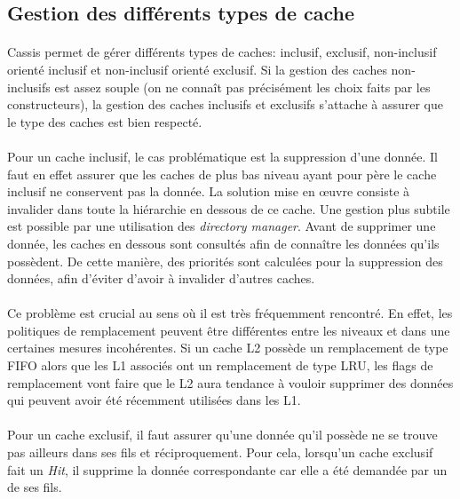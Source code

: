\subsection{Gestion des différents types de cache}
\paragraph{}
\textsf{Cassis} permet de gérer différents types de caches: inclusif, exclusif, non-inclusif orienté inclusif et non-inclusif orienté exclusif. Si la gestion des caches non-inclusifs est assez souple (on ne connaît pas précisément les choix faits par les constructeurs), la gestion des caches inclusifs et exclusifs s'attache à assurer que le type des caches est bien respecté.

\paragraph{}
Pour un cache inclusif, le cas problématique est la suppression d'une donnée. Il faut en effet assurer que les caches de plus bas niveau ayant pour père le cache inclusif ne conservent pas la donnée. La solution mise en {\oe}uvre consiste à invalider dans toute la hiérarchie en dessous de ce cache. Une gestion plus subtile est possible par une utilisation des \emph{directory manager}. Avant de supprimer une donnée, les caches en dessous sont consultés afin de connaître les données qu'ils possèdent. De cette manière, des priorités sont calculées pour la suppression des données, afin d'éviter d'avoir à invalider d'autres caches.

\paragraph{}
Ce problème est crucial au sens où il est très fréquemment rencontré. En effet, les politiques de remplacement peuvent être différentes entre les niveaux et dans une certaines mesures incohérentes. Si un cache L2 possède un remplacement de type FIFO alors que les L1 associés ont un remplacement de type LRU, les flags de remplacement vont faire que le L2 aura tendance à vouloir supprimer des données qui peuvent avoir été récemment utilisées dans les L1.

\paragraph{}
Pour un cache exclusif, il faut assurer qu'une donnée qu'il possède ne se trouve pas ailleurs dans ses fils et réciproquement. Pour cela, lorsqu'un cache exclusif fait un \emph{Hit}, il supprime la donnée correspondante car elle a été demandée par un de ses fils.

